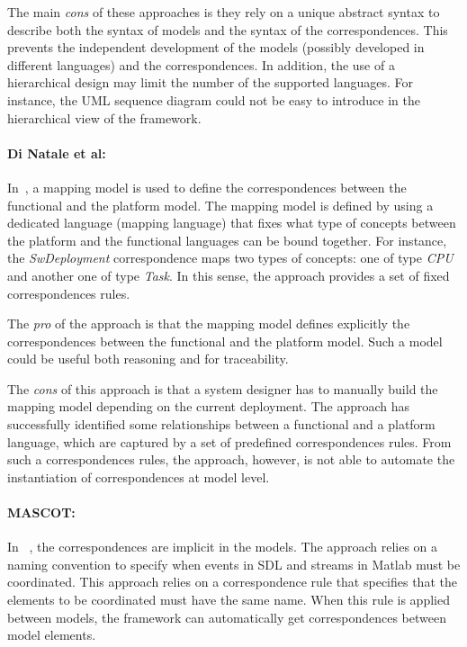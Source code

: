 The main \emph{cons} of these approaches is they rely on a unique abstract syntax to describe both the syntax of models and the syntax of the correspondences. This prevents the independent development of the models (possibly developed in different languages) and the correspondences. In addition, the use of a hierarchical design may limit the number of the supported languages. For instance, the UML sequence diagram could not be easy to introduce in the hierarchical view of the framework.

\paragraph{Di Natale et al: }
In~\cite{dinatale}, a mapping model is used to define the correspondences between the functional and the platform model. The mapping model is defined by using a dedicated language (\ie mapping language) that fixes what type of concepts between the platform and the functional languages can be bound together. For instance, the \emph{SwDeployment} correspondence maps two types of concepts: one of type \emph{CPU} and another one of type \emph{Task}. In this sense, the approach provides a set of fixed correspondences rules. 

The \emph{pro} of the approach is that the mapping model defines explicitly the correspondences between the functional and the platform model. Such a model could be useful both reasoning and for traceability. 

The \emph{cons} of this approach is that a system designer has to manually build the mapping model depending on the current deployment. The approach has successfully identified some relationships between a functional and a platform language, which are captured by a set of predefined correspondences rules. From such a correspondences rules, the approach, however, is not able to automate the instantiation of correspondences at model level. 

\paragraph{MASCOT: }
In ~\cite{mascotbib}, the correspondences are implicit in the models. The approach relies on a naming convention to specify when events in SDL and streams in Matlab must be coordinated. This approach relies on a correspondence rule that specifies that the elements to be coordinated must have the same name. When this rule is applied between models, the framework can automatically get correspondences between model elements.

